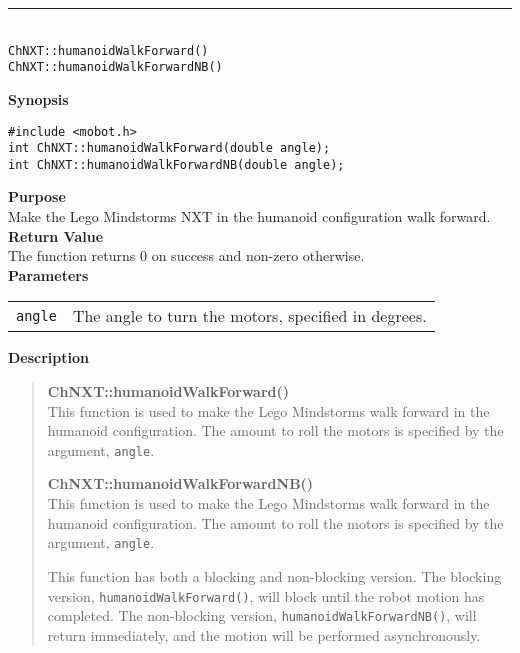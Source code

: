 \noindent
\vspace{5pt}
\rule{4.5in}{0.015in}\\
\noindent
{\LARGE \texttt{ChNXT::humanoidWalkForward()}}\\
{\LARGE \texttt{ChNXT::humanoidWalkForwardNB()}}\\
{}

\noindent
{\bf Synopsis}
\begin{lstlisting}
#include <mobot.h>
int ChNXT::humanoidWalkForward(double angle);
int ChNXT::humanoidWalkForwardNB(double angle);
\end{lstlisting}

\noindent
{\bf Purpose}\\
Make the Lego Mindstorms NXT in the humanoid configuration walk forward.\\

\noindent
{\bf Return Value}\\
The function returns 0 on success and non-zero otherwise.\\

\noindent
{\bf Parameters}\\
\vspace{-0.1in}
\begin{description}
\item               
\begin{tabular}{p{15 mm}p{145 mm}}
\texttt{angle} & The angle to turn the motors, specified in degrees.\\
\end{tabular}
\end{description}

\noindent
{\bf Description}\\
\vspace{-12pt}
\begin{quote}
{\bf ChNXT::humanoidWalkForward()}\\
This function is used to make the Lego Mindstorms walk forward in the humanoid
configuration. The amount to roll the motors is specified by the argument,
\texttt{angle}.

{\bf ChNXT::humanoidWalkForwardNB()}\\
This function is used to make the Lego Mindstorms walk forward in the humanoid
configuration. The amount to roll the motors is specified by the argument,
\texttt{angle}.

This function has both a blocking and non-blocking version.
The blocking version, \texttt{humanoidWalkForward()}, will block until the
robot motion has completed. The non-blocking version, \texttt{humanoidWalkForwardNB()},
will return immediately, and the motion will be performed asynchronously.\\
\end{quote}

